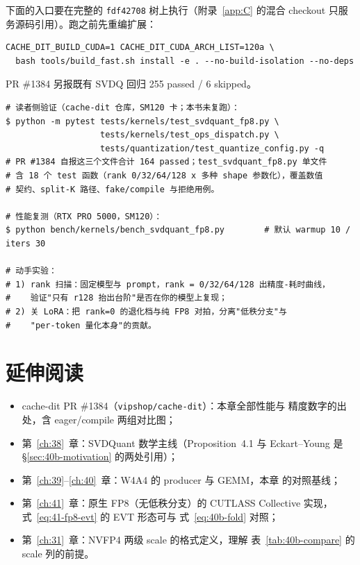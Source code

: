 下面的入口要在完整的 \texttt{fdf42708} 树上执行（附录~\ref{app:C} 的混合
checkout 只服务源码引用）。跑之前先重编扩展：

\begin{lstlisting}[style=console]
CACHE_DIT_BUILD_CUDA=1 CACHE_DIT_CUDA_ARCH_LIST=120a \
  bash tools/build_fast.sh install -e . --no-build-isolation --no-deps
\end{lstlisting}

\noindent PR \#1384 另报既有 SVDQ 回归 255 passed / 6 skipped。

\begin{lstlisting}[style=console]
# 读者侧验证（cache-dit 仓库，SM120 卡；本书未复跑）：
$ python -m pytest tests/kernels/test_svdquant_fp8.py \
                   tests/kernels/test_ops_dispatch.py \
                   tests/quantization/test_quantize_config.py -q
# PR #1384 自报这三个文件合计 164 passed；test_svdquant_fp8.py 单文件
# 含 18 个 test 函数（rank 0/32/64/128 x 多种 shape 参数化），覆盖数值
# 契约、split-K 路径、fake/compile 与拒绝用例。

# 性能复测（RTX PRO 5000，SM120）：
$ python bench/kernels/bench_svdquant_fp8.py        # 默认 warmup 10 / iters 30

# 动手实验：
# 1) rank 扫描：固定模型与 prompt，rank = 0/32/64/128 出精度-耗时曲线，
#    验证"只有 r128 抬出台阶"是否在你的模型上复现；
# 2) 关 LoRA：把 rank=0 的退化档与纯 FP8 对拍，分离"低秩分支"与
#    "per-token 量化本身"的贡献。
\end{lstlisting}

\section*{延伸阅读}

\begin{itemize}[itemsep=1pt,topsep=2pt]
  \item cache-dit PR \#1384（\texttt{vipshop/cache-dit}）：本章全部性能与
        精度数字的出处，含 eager/compile 两组对比图；
  \item 第~\ref{ch:38}~章：SVDQuant 数学主线（Proposition~4.1 与
        Eckart--Young 是 \S\ref{sec:40b-motivation} 的两处引用）；
  \item 第~\ref{ch:39}--\ref{ch:40}~章：W4A4 的 producer 与 GEMM，本章
        的对照基线；
  \item 第~\ref{ch:41}~章：原生 FP8（无低秩分支）的 CUTLASS Collective
        实现，式~\ref{eq:41-fp8-evt} 的 EVT 形态可与
        式~\eqref{eq:40b-fold} 对照；
  \item 第~\ref{ch:31}~章：NVFP4 两级 scale 的格式定义，理解
        表~\ref{tab:40b-compare} 的 scale 列的前提。
\end{itemize}
